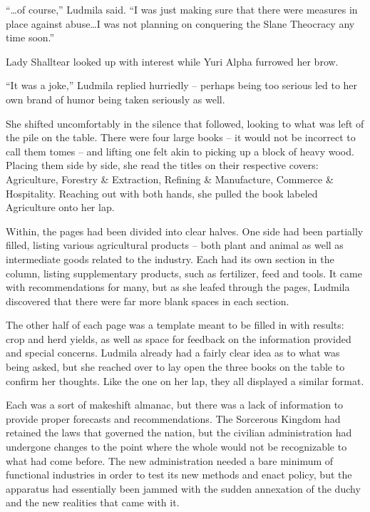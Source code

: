  

“…of course,” Ludmila said. “I was just making sure that there were measures in place against abuse…I was not planning on conquering the Slane Theocracy any time soon.”

 

Lady Shalltear looked up with interest while Yuri Alpha furrowed her brow.

 

“It was a joke,” Ludmila replied hurriedly – perhaps being too serious led to her own brand of humor being taken seriously as well.

 

She shifted uncomfortably in the silence that followed, looking to what was left of the pile on the table. There were four large books – it would not be incorrect to call them tomes – and lifting one felt akin to picking up a block of heavy wood. Placing them side by side, she read the titles on their respective covers: Agriculture, Forestry \& Extraction, Refining \& Manufacture, Commerce \& Hospitality. Reaching out with both hands, she pulled the book labeled Agriculture onto her lap.

 

Within, the pages had been divided into clear halves. One side had been partially filled, listing various agricultural products – both plant and animal as well as intermediate goods related to the industry. Each had its own section in the column, listing supplementary products, such as fertilizer, feed and tools. It came with recommendations for many, but as she leafed through the pages, Ludmila discovered that there were far more blank spaces in each section.

 

The other half of each page was a template meant to be filled in with results: crop and herd yields, as well as space for feedback on the information provided and special concerns. Ludmila already had a fairly clear idea as to what was being asked, but she reached over to lay open the three books on the table to confirm her thoughts. Like the one on her lap, they all displayed a similar format.

 

Each was a sort of makeshift almanac, but there was a lack of information to provide proper forecasts and recommendations. The Sorcerous Kingdom had retained the laws that governed the nation, but the civilian administration had undergone changes to the point where the whole would not be recognizable to what had come before. The new administration needed a bare minimum of functional industries in order to test its new methods and enact policy, but the apparatus had essentially been jammed with the sudden annexation of the duchy and the new realities that came with it.

